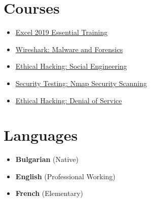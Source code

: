 \documentclass[letterpaper, 10pt]{article}
\begin{document}
	\begin{center}
		\begin{minipage}[t]{0.5\textwidth}
			\section*{Courses}
			\begin{itemize}
				\item \href{{}{https}://raw.githubusercontent.com/svetlyobg/LaTeX-CV/main/Excel%
				
				\item \href{{}{https}://raw.githubusercontent.com/svetlyobg/LaTeX-CV/main/Wireshark%
				
				\item \href{https://raw.githubusercontent.com/svetlyobg/LaTeX-CV/main/EthicalHackingSocialEngineering.png}{Ethical
					Hacking: Social Engineering}
				
				\item \href{https://raw.githubusercontent.com/svetlyobg/LaTeX-CV/main/SecurityTesting-NmapSecurityScanning.png}{Security
					Testing: Nmap Security Scanning}
				
				\item \href{https://raw.githubusercontent.com/svetlyobg/LaTeX-CV/main/EthicalHacking-DenialofService.png}{Ethical
					Hacking: Denial of Service}
			\end{itemize}
		\end{minipage}%
		\begin{minipage}[t]{0.5\textwidth}
			\section*{Languages}
			\begin{itemize}
				\item \textbf{Bulgarian} (Native)
				
				\item \textbf{English} (Professional Working)
				
				\item \textbf{French} (Elementary)
			\end{itemize}
			\newpage

\end{minipage}
\end{center}
\end{document}
